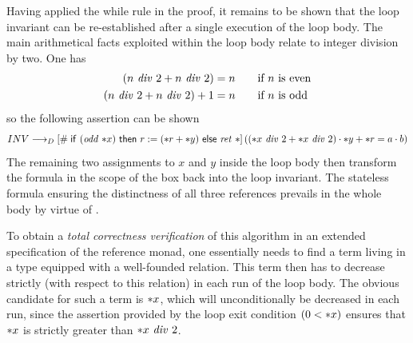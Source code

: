 Having applied the while rule  in the proof, it remains to be
shown that the loop invariant can be re-established after a single execution of
the loop body. The main arithmetical facts exploited within the loop body relate
to integer division by two. One has
\begin{align*}
  (n\ \mathit{div}\ 2 + n\ \mathit{div}\ 2) &= n \qquad \text{if $n$ is even}\\
  (n\ \mathit{div}\ 2 + n\ \mathit{div}\ 2) + 1 &= n \qquad \text{if $n$ is odd}\\
\end{align*}
so the following assertion can be shown
\[
  INV \longrightarrow_D \PDLSBox{\If\ (\op{odd}\ \rd{x})\ \Then\ r:=(\rd{r} + \rd{y})\ \Else\
    \ret\ \unit}{\left((\rd{x}\ \op{div}\ 2 + \rd{x}\ \op{div}\ 2) \cdot \rd{y}
    + \rd{r} = a\cdot b\right)}
\]
The remaining two assignments to $x$ and $y$ inside the loop body then transform
the formula in the scope of the box back into the loop invariant. The stateless
formula ensuring the distinctness of all three references prevails in the
whole body by virtue of \irule{pdl-k3B}.

To obtain a \emph{total correctness verification} of this algorithm in an
extended specification of the reference monad, one essentially needs to find a
term living in a type equipped with a well-founded relation. This term then has
to decrease strictly (with respect to this relation) in each run of the loop
body. The obvious candidate for such a term is ${\ast x}$, which will
unconditionally be decreased in each run, since the assertion provided by the
loop exit condition $(0 < {\ast x})$ ensures that ${\ast x}$ is strictly greater
than $\rd{x}\ \op{div}\ 2$.

